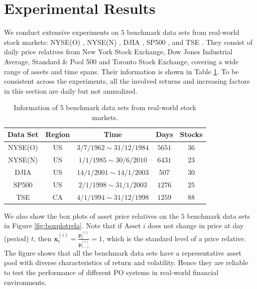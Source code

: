\documentclass[twoside,11pt]{article}
\begin{document}
\section{Experimental Results}
\label{sec:experiment}
We conduct extensive experiments on $5$ benchmark data sets from real-world stock markets: NYSE(O) \citep{uPS1}, NYSE(N) \citep{CWMR}, DJIA \citep{anticor}, SP500 \citep{anticor}, and TSE \citep{anticor}. They consist of daily price relatives from New York Stock Exchange, Dow Jones Industrial Average, Standard \& Pool 500 and Toronto Stock Exchange, covering a wide range of assets and time spans. Their information is shown in Table \ref{tab:data}. To be consistent across the experiments, all the involved returns and increasing factors in this section are daily but not annualized.
\begin{table}[!htb]
\centering
\small
\begin{tabular}{|c|@{}c@{}|c|@{}c@{}|c|}
\hline
 Data Set & Region  &  Time  & Days  & Stocks     \\
 \hline
  NYSE(O)& US & $3/7/1962\sim31/12/1984$ & $5651$ &  $36$ \\
   NYSE(N) & US & $1/1/1985\sim30/6/2010$ &$6431$  & $23$ \\
 DJIA  & US & $14/1/2001\sim14/1/2003$ &$507$  & $30$ \\
   SP500& US & $2/1/1998\sim31/1/2003$ & $1276$ & $25$ \\
     TSE&  CA & $4/1/1994\sim31/12/1998$ & $1259$  & $88$ \\
  \hline
\end{tabular}
\normalsize
\caption{Information of $5$ benchmark data sets from real-world stock markets.}
\label{tab:data}
\end{table}

We also show the box plots of asset price relatives on the $5$ benchmark data sets in Figure \ref{fig:boxplotrela}. Note that if Asset $i$ does not change in price at day (period) $t$, then $\mathbf{x}_t^{(i)}=\frac{\mathbf{p}_t^{(i)}}{\mathbf{p}_{t-1}^{(i)}}=1$, which is the standard level of a price relative. The figure shows that all the benchmark data sets have a representative asset pool with diverse characteristics of return and volatility. Hence they are reliable to test the performance of different PO systems in real-world financial environments.
\end{document}
